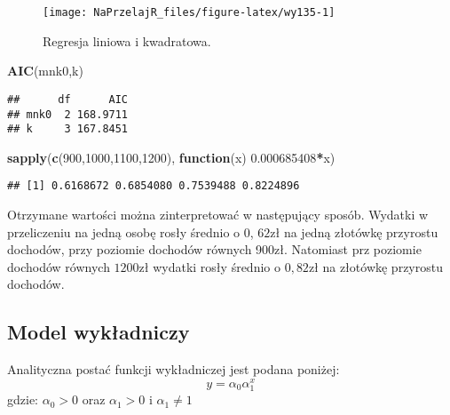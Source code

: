 \documentclass[polish,]{book}
\newenvironment{Shaded}{\begin{snugshade}}{\end{snugshade}}
\newcommand{\ControlFlowTok}[1]{\textcolor[rgb]{0.13,0.29,0.53}{\textbf{#1}}}
\newcommand{\DecValTok}[1]{\textcolor[rgb]{0.00,0.00,0.81}{#1}}
\newcommand{\FloatTok}[1]{\textcolor[rgb]{0.00,0.00,0.81}{#1}}
\newcommand{\KeywordTok}[1]{\textcolor[rgb]{0.13,0.29,0.53}{\textbf{#1}}}
\newcommand{\NormalTok}[1]{#1}
\newcommand{\OperatorTok}[1]{\textcolor[rgb]{0.81,0.36,0.00}{\textbf{#1}}}
\begin{document}
\begin{figure}[h]

{\centering \texttt{[image: NaPrzelajR\_files/figure-latex/wy135-1]} 

}

\caption{Regresja liniowa i kwadratowa.}\label{fig:wy135}
\end{figure}

\begin{Shaded}
\begin{Highlighting}[]
\KeywordTok{AIC}\NormalTok{(mnk0,k)}
\end{Highlighting}
\end{Shaded}

\begin{verbatim}
##      df      AIC
## mnk0  2 168.9711
## k     3 167.8451
\end{verbatim}

\begin{Shaded}
\begin{Highlighting}[]
\KeywordTok{sapply}\NormalTok{(}\KeywordTok{c}\NormalTok{(}\DecValTok{900}\NormalTok{,}\DecValTok{1000}\NormalTok{,}\DecValTok{1100}\NormalTok{,}\DecValTok{1200}\NormalTok{), }\ControlFlowTok{function}\NormalTok{(x) }\FloatTok{0.000685408}\OperatorTok{*}\NormalTok{x)}
\end{Highlighting}
\end{Shaded}

\begin{verbatim}
## [1] 0.6168672 0.6854080 0.7539488 0.8224896
\end{verbatim}

Otrzymane wartości można zinterpretować w następujący sposób. Wydatki w przeliczeniu na jedną osobę rosły średnio o 0, \(62\)zł na jedną złotówkę przyrostu dochodów,
przy poziomie dochodów równych 900zł. Natomiast prz poziomie dochodów równych
\(1200\)zł wydatki rosły średnio o \(0,82\)zł na złotówkę przyrostu dochodów.

\hypertarget{part_13.3.2}{%
\subsection{Model wykładniczy}\label{part_13.3.2}}

Analityczna postać funkcji wykładniczej jest podana poniżej:
\begin{equation}
y=\alpha_0\alpha_1^x
\label{eq:wz1328}
\end{equation}
gdzie: \(\alpha_0>0\) oraz \(\alpha_1>0\) i \(\alpha_1\neq 1\)
\end{document}
